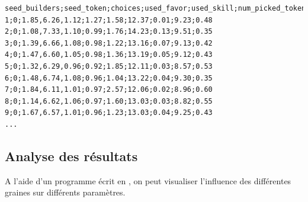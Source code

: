 \begin{lstlisting}[frame=single, caption={Affichage des résultats}]
seed_builders;seed_token;choices;used_favor;used_skill;num_picked_tokens;forced_skip;nb_turns;result
1;0;1.85,6.26,1.12;1.27;1.58;12.37;0.01;9.23;0.48
2;0;1.08,7.33,1.10;0.99;1.76;14.23;0.13;9.51;0.35
3;0;1.39,6.66,1.08;0.98;1.22;13.16;0.07;9.13;0.42
4;0;1.47,6.60,1.05;0.98;1.36;13.19;0.05;9.12;0.43
5;0;1.32,6.29,0.96;0.92;1.85;12.11;0.03;8.57;0.53
6;0;1.48,6.74,1.08;0.96;1.04;13.22;0.04;9.30;0.35
7;0;1.84,6.11,1.01;0.97;2.57;12.06;0.02;8.96;0.60
8;0;1.14,6.62,1.06;0.97;1.60;13.03;0.03;8.82;0.55
9;0;1.67,6.57,1.01;0.96;1.23;13.03;0.04;9.25;0.43
...
\end{lstlisting}

\subsection{Analyse des résultats}

A l'aide d'un programme écrit en , on peut visualiser l'influence des différentes graines sur différents paramètres.


